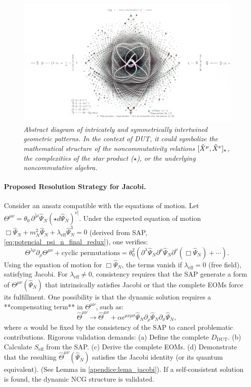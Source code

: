 \documentclass[11pt, a4paper]{article}
\theoremstyle{remark}
\newcommand{\Op}[1]{\hat{#1}}
\begin{document}
\begin{figure}[htbp]
    \centering
    \includegraphics[width=0.7\linewidth]{OIG25.ZNLJ.PNG}
    \caption{%
       \footnotesize\textit{Abstract diagram of intricately and symmetrically intertwined geometric patterns. In the context of DUT, it could symbolize the mathematical structure of the noncommutativity relations \( [\protect\Op{X}^{\mu}, \protect\Op{X}^{\nu}]_{\star} \), the complexities of the star product (\(\star\)), or the underlying noncommutative algebra.}
    }
    \label{fig:Figura6}
\end{figure}

\paragraph{Proposed Resolution Strategy for Jacobi.}
\label{ssubsec:jacobi_resolution_strategy}
Consider an ansatz compatible with the equations of motion. Let \( \Theta^{\mu\nu} = \theta_0 \, \partial^{[\mu} \Op{\Psi}_N (\star d\Op{\Psi}_N)^{\nu]} \). Under the expected equation of motion \( \Box \Op{\Psi}_N + m_N^2 \Op{\Psi}_N + \lambda_{\text{eff}} \Op{\Psi}_N^3 = 0 \) (derived from SAP, \cref{eq:potencial_psi_n_final_redux}), one verifies:
\[
\Theta^{\lambda\rho} \partial_\rho \Theta^{\mu\nu} + \text{cyclic permutations} = \theta_0^2 \left( \partial^\lambda \Op{\Psi}_N \partial^\mu \Op{\Psi}_N \partial^\nu (\Box \Op{\Psi}_N) + \cdots \right).
\]
Using the equation of motion for \( \Box \Op{\Psi}_N \), the terms vanish if \( \lambda_{\text{eff}} = 0 \) (free field), satisfying Jacobi. For \( \lambda_{\text{eff}} \neq 0 \), consistency requires that the SAP generate a form of \( \Theta^{\mu\nu}(\Op{\Psi}_N) \) that intrinsically satisfies Jacobi or that the complete EOMs force its fulfillment. One possibility is that the dynamic solution requires a **compensating term** in \( \Theta^{\mu\nu} \), such as:
\[
\Op{\Theta}^{\mu\nu} \to \Op{\Theta}^{\mu\nu} + \alpha \epsilon^{\mu\nu\rho\sigma} \Op{\Psi}_N \partial_\rho \Op{\Psi}_N \partial_\sigma \Op{\Psi}_N,
\]
where \( \alpha \) would be fixed by the consistency of the SAP to cancel problematic contributions. Rigorous validation demands: (a) Define the complete \( D_{\text{DUT}} \). (b) Calculate \( S_{\text{eff}} \) from the SAP. (c) Derive the complete EOMs. (d) Demonstrate that the resulting \( \Op{\Theta}^{\mu\nu}(\Op{\Psi}_N) \) satisfies the Jacobi identity (or its quantum equivalent). (See Lemma in \cref{apendice:lema_jacobi}). If a self-consistent solution is found, the dynamic NCG structure is validated.
\end{document}
